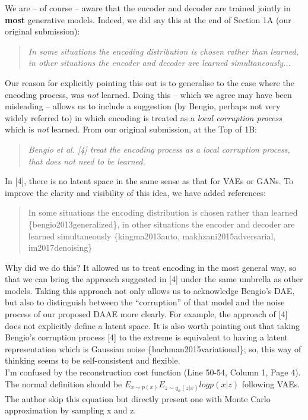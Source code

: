 \documentclass[a4paper,11pt]{article}
\begin{document}
 We are -- of course -- aware that the encoder and decoder are trained jointly in \textbf{most} generative models. Indeed, we did say this at the end of Section 1A (our original submission):
    \begin{quote}
        {\it In some situations the encoding distribution is chosen rather than learned, in other  situations the encoder and decoder are learned simultaneously...}
    \end{quote}
Our reason for explicitly pointing this out is to generalise to the case where the encoding process, was {\em not} learned. Doing this -- which we agree may have been misleading -- allows us to include a suggestion (by Bengio, perhaps not very widely referred to) in which encoding is treated as a {\em local corruption process} which is {\em not} learned.  From our original submission, at the Top of 1B:
    \begin{quote}
        {\it Bengio  et  al.  [4]  treat  the  encoding  process  as  a  local corruption  process,  that  does  not  need  to  be  learned.}
    \end{quote}
In [4], there is no latent space in the same sense as that for VAEs or GANs. To improve the clarity and visibility of this idea, we have added references:
\begin{quote}
    {\color{red} In some situations the encoding distribution is chosen rather than learned \{bengio2013generalized\}, in other situations the encoder and decoder are learned simultaneously \{kingma2013auto, makhzani2015adversarial, im2017denoising\}}
\end{quote}
Why did we do this?  It allowed us to treat encoding in the most general way, so that we can bring the approach suggested in [4] under the same umbrella as other models. Taking this approach not only allows us to acknowledge Bengio's DAE, but also to distinguish between the ``corruption'' of that model and the noise process of our proposed DAAE more clearly. For example, the approach of [4] does not explicitly define a latent space.  It is also worth pointing out that taking Bengio's corruption process [4] to the extreme is equivalent to having a latent representation which is Gaussian noise \{bachman2015variational\}; so, this way of thinking seems to be self-consistent and flexible.\\


{\color{blue}
I’m confused by the reconstruction cost function (Line 50-54, Column 1, Page 4). The normal definition should be $E_{x\sim p(x)} E_{z\sim q_{\phi}(z|x)} log p(x | z)$ following VAEs. The author skip this equation but directly present one with Monte Carlo approximation by sampling x and z. }\\
\end{document}
